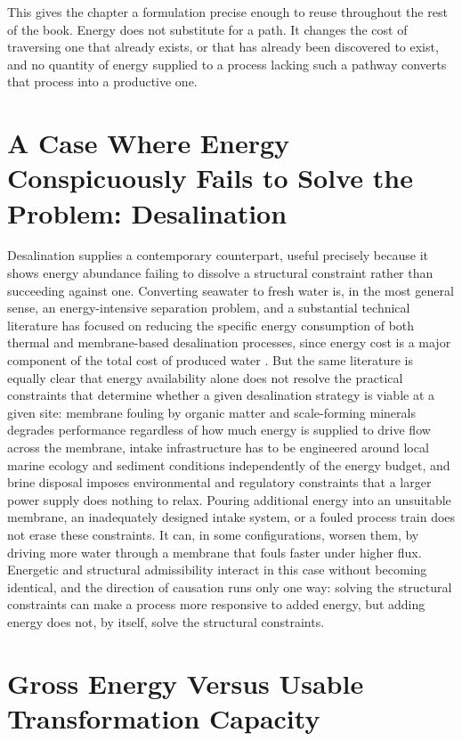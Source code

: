 \documentclass[11pt]{book}
\begin{document}
This gives the chapter a formulation precise enough to reuse throughout the rest of the book. Energy does not substitute for a path. It changes the cost of traversing one that already exists, or that has already been discovered to exist, and no quantity of energy supplied to a process lacking such a pathway converts that process into a productive one.

\section{A Case Where Energy Conspicuously Fails to Solve the Problem: Desalination}

Desalination supplies a contemporary counterpart, useful precisely because it shows energy abundance failing to dissolve a structural constraint rather than succeeding against one. Converting seawater to fresh water is, in the most general sense, an energy-intensive separation problem, and a substantial technical literature has focused on reducing the specific energy consumption of both thermal and membrane-based desalination processes, since energy cost is a major component of the total cost of produced water \cite{elimelech2011}. But the same literature is equally clear that energy availability alone does not resolve the practical constraints that determine whether a given desalination strategy is viable at a given site: membrane fouling by organic matter and scale-forming minerals degrades performance regardless of how much energy is supplied to drive flow across the membrane, intake infrastructure has to be engineered around local marine ecology and sediment conditions independently of the energy budget, and brine disposal imposes environmental and regulatory constraints that a larger power supply does nothing to relax. Pouring additional energy into an unsuitable membrane, an inadequately designed intake system, or a fouled process train does not erase these constraints. It can, in some configurations, worsen them, by driving more water through a membrane that fouls faster under higher flux. Energetic and structural admissibility interact in this case without becoming identical, and the direction of causation runs only one way: solving the structural constraints can make a process more responsive to added energy, but adding energy does not, by itself, solve the structural constraints.

\section{Gross Energy Versus Usable Transformation Capacity}
\end{document}
